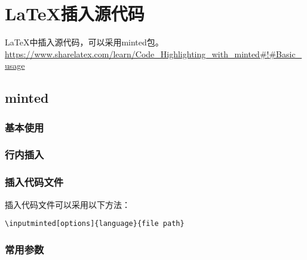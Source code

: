\chapter{\LaTeX 插入源代码}
\LaTeX 中插入源代码，可以采用minted包。
\url{https://www.sharelatex.com/learn/Code_Highlighting_with_minted#!#Basic_usage}

\section{minted}

\subsection{基本使用}


\subsection{行内插入}
\subsection{插入代码文件}
插入代码文件可以采用以下方法：
\begin{verbatim}
\inputminted[options]{language}{file path}
\end{verbatim}

\subsection{常用参数}